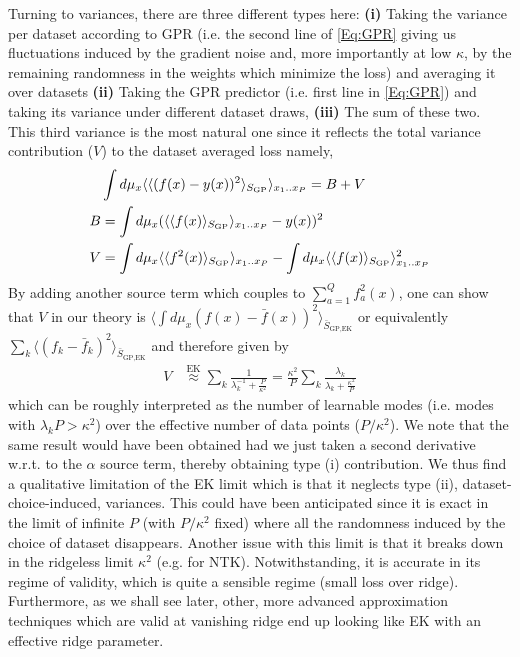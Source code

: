 Turning to variances, there are three different types here: {\bf (i)} Taking the variance per dataset according to GPR (i.e. the second line of \ref{Eq:GPR} giving us fluctuations induced by the gradient noise and, more importantly at low $\kappa$, by the remaining randomness in the weights which minimize the loss) and averaging it over datasets {\bf (ii)} Taking the GPR predictor (i.e. first line in \ref{Eq:GPR}) and taking its variance under different dataset draws, {\bf (iii)} The sum of these two. This third variance is the most natural one since it reflects the total variance contribution ($V$) to the dataset averaged loss namely, 
\begin{align}
&\int d\mu_x \langle \langle (f(x)-y(x))^2 \rangle_{S_{\text{GP}}} \rangle_{x_1..x_P} = B + V \\ \nonumber 
B &=  \int d\mu_x (\langle \langle f(x) \rangle_{S_{\text{GP}}} \rangle_{x_1..x_P}-y(x))^2 \\ \nonumber 
V &=\int d\mu_x \langle \langle f^2(x) \rangle_{S_{\text{GP}}} \rangle_{x_1..x_P} - \int d\mu_x \langle\langle  f(x) \rangle_{S_{\text{GP}}} \rangle_{x_1..x_P}^2 
\end{align}
By adding another source term which couples to $\sum_{a=1}^{Q} f_a^2(x)$, one can show that $V$ in our theory is $\langle \int d\mu_x (f(x)-\bar{f}(x))^2 \rangle_{\bar{S}_{\text{GP,EK}}}$ or equivalently $\sum_k \langle (f_k-\bar{f}_k)^2 \rangle_{\bar{S}_{\text{GP,EK}}}$ and therefore given by 
\begin{align}
V &\stackrel{\text{EK}}{\approx} \sum_k \frac{1}{\lambda_k^{-1}+\frac{P}{\kappa^{2}}} = \frac{\kappa^2}{P} \sum_k \frac{\lambda_k}{\lambda_k+\frac{\kappa^{2}}{P}}
\end{align}
which can be roughly interpreted as the number of learnable modes (i.e. modes with $\lambda_k P > \kappa^2$) over the effective number of data points ($P/\kappa^2$). We note that the same result would have been obtained had we just taken a second derivative w.r.t. to the  $\alpha$ source term, thereby obtaining type (i)  contribution. We thus find a qualitative limitation of the EK limit which is that it neglects type (ii), dataset-choice-induced, variances. This could have been anticipated since it is exact in the limit of infinite $P$ (with $P/\kappa^2$ fixed) where all the randomness induced by the choice of dataset disappears. Another issue with this limit is that it breaks down in the ridgeless limit $\kappa^2$ (e.g. for NTK). Notwithstanding, it is accurate in its regime of validity, which is quite a sensible regime (small loss over ridge). Furthermore, as we shall see later, other, more advanced approximation techniques which are valid at vanishing ridge end up looking like EK with an effective ridge parameter. 

